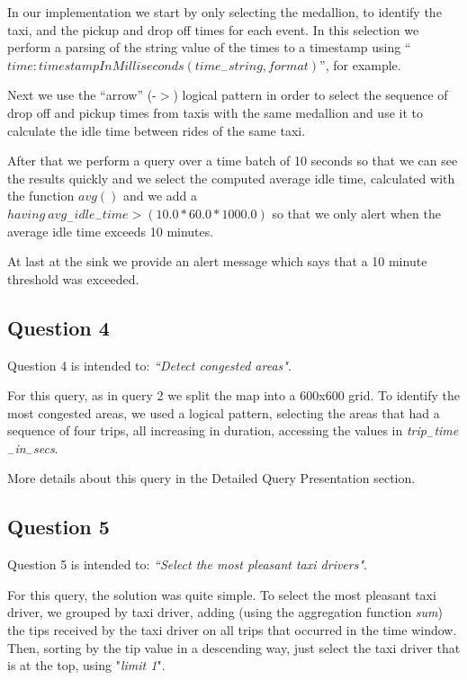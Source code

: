 In our implementation we start by only selecting the medallion, to identify the taxi, and the pickup and drop off times for each event. In this selection we perform a parsing of the string value of the times to a timestamp using ``$time:timestampInMilliseconds(time_-string, format)$'', for example.

Next we use the ``arrow'' (-$>$) logical pattern in order to select the sequence of drop off and pickup times from taxis with the same medallion and use it to calculate the idle time between rides of the same taxi.

After that we perform a query over a time batch of 10 seconds so that we can see the results quickly and we select the computed average idle time, calculated with the function \textit{$avg()$} and we add a \textit{$having \ avg_-idle_-time > (10.0*60.0*1000.0)$} so that we only alert when the average idle time exceeds 10 minutes.

At last at the sink we provide an alert message which says that a 10 minute threshold was exceeded.

\subsection{Question 4}

Question 4 is intended to: \textit{``Detect congested areas"}.\par
For this query, as in query 2 we split the map into a 600x600 grid. To identify the most congested areas, we used a logical pattern, selecting the areas that had a sequence of four trips, all increasing in duration, accessing the values in \textit{trip$_-$time$_-$in$_-$secs}.\par
More details about this query in the Detailed Query Presentation section. 

\subsection{Question 5}

Question 5 is intended to: \textit{``Select the most pleasant taxi drivers"}.\par
For this query, the solution was quite simple. To select the most pleasant taxi driver, we grouped by taxi driver, adding (using the aggregation function \textit{sum}) the tips received by the taxi driver on all trips that occurred in the time window. Then, sorting by the tip value in a descending way, just select the taxi driver that is at the top, using "\textit{limit 1}". 













